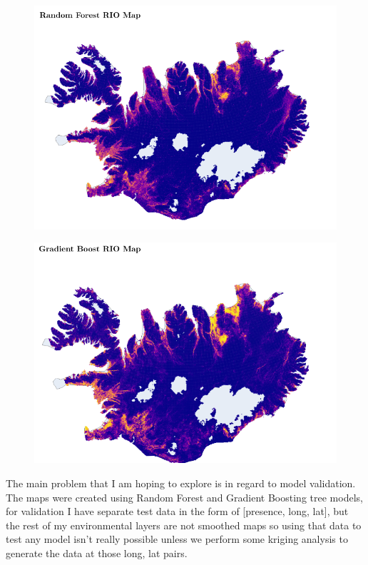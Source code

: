 \documentclass[12pt]{article}
\theoremstyle{homework}
\begin{document}
  \begin{figure}[H]
    \begin{center}
    \includegraphics[width = .75\textwidth]{randomforest.png}
    \end{center}
  \end{figure}

  \begin{figure}[H]
    \begin{center}
    \includegraphics[width = .75\textwidth]{gradientboost.png}
    \end{center}
  \end{figure}

  The main problem that I am hoping to explore is in regard to model validation. The maps were created using Random Forest and Gradient Boosting tree models, for validation 
  I have separate test data in the form of [presence, long, lat], but the rest of my environmental layers are not smoothed maps so using that data to 
  test any model isn't really possible unless we perform some kriging analysis to generate the data at those long, lat pairs. 
  

  
\end{document}
